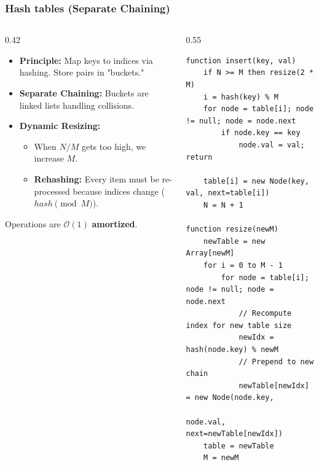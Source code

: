 \documentclass[8pt,aspectratio=169]{beamer}
\begin{document}
\begin{frame}[fragile]
\frametitle{Hash tables (Separate Chaining)}

\begin{columns}[T]
    \begin{column}{0.42\textwidth}
        \begin{itemize}
            \item \textbf{Principle:} Map keys to indices via hashing. Store pairs in "buckets."
            \item \textbf{Separate Chaining:} Buckets are linked lists handling collisions.
            \item \textbf{Dynamic Resizing:} 
            \begin{itemize}
                \item When $N/M$ gets too high, we increase $M$.
                \item \textbf{Rehashing:} Every item must be re-processed because indices change ($hash \pmod M$).
            \end{itemize}
        \end{itemize}
        \vspace{1em}
        Operations are $\mathcal{O}(1)$ \textbf{amortized}.
    \end{column}

    \begin{column}{0.55\textwidth}
    \begin{lstlisting}[basicstyle=\tiny\ttfamily, frame=single]
function insert(key, val)
    if N >= M then resize(2 * M)
    i = hash(key) % M
    for node = table[i]; node != null; node = node.next
        if node.key == key
            node.val = val; return
            
    table[i] = new Node(key, val, next=table[i])
    N = N + 1

function resize(newM)
    newTable = new Array[newM]
    for i = 0 to M - 1
        for node = table[i]; node != null; node = node.next
            // Recompute index for new table size
            newIdx = hash(node.key) % newM
            // Prepend to new chain
            newTable[newIdx] = new Node(node.key, 
                               node.val, next=newTable[newIdx])
    table = newTable
    M = newM
    \end{lstlisting}
    \end{column}
\end{columns}
\end{frame}
\end{document}

